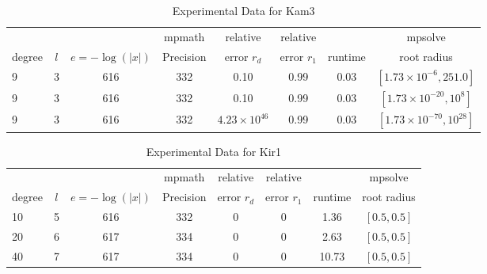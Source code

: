 \documentclass[sigconf]{acmart}
\begin{document}
\begin{table}[t]
\caption{Experimental Data for Kam3}
\label{tab:kam3}
\vskip 0.15in
\begin{center}
\begin{small}
\begin{sc}
\begin{tabular}{lccccccc}
\toprule
&  &  & mpmath & relative  & relative &  & mpsolve \\
degree  & $l$& $e=-\log(|x|)$& Precision &error $r_d$       & error $r_1$ &runtime& root radius\\
\midrule
   9 & 3 & 616 & 332 & 0.10 & 0.99 & 0.03 & $[1.73 \times 10^{-6},251.0]$ \\
   9 & 3 & 616 & 332 & 0.10 & 0.99 & 0.03 & $[1.73 \times 10^{-20},10^8]$\\ %
   9 & 3 & 616 & 332 & $4.23 \times 10^{46}$ & 0.99 & 0.03 & $[1.73 \times 10^{-70},10^{28}]$\\
\bottomrule
\end{tabular}
\end{sc}
\end{small}
\end{center}
\vskip -0.1in
\end{table}

\begin{table}[t]
\caption{Experimental Data for Kir1}
\label{tab:kir1}
\vskip 0.15in
\begin{center}
\begin{small}
\begin{sc}
\begin{tabular}{lccccccc}
\toprule
&  &  & mpmath & relative  & relative &  & mpsolve \\
degree  & $l$& $e=-\log(|x|)$& Precision &error $r_d$       & error $r_1$ &runtime& root radius\\
\midrule
   10 & 5 & 616 & 332 & 0 & 0 & 1.36 & $[0.5, 0.5]$\\
   20 & 6 & 617 & 334 & 0 & 0 & 2.63 & $[0.5, 0.5]$\\
   40 & 7 & 617 & 334 & 0 & 0 & 10.73 & $[0.5, 0.5]$\\
\bottomrule
\end{tabular}
\end{sc}
\end{small}
\end{center}
\vskip -0.1in
\end{table}
\end{document}
